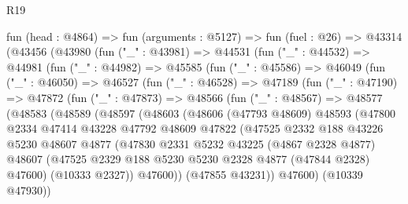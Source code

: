 \begin{lexlean}{R19}
\begin{coremodule}
  fun (head : @4864) =>
  fun (arguments : @5127) =>
  fun (fuel : @26) =>
  @43314
    (@43456
      (@43980
        (fun ("_" : @43981) =>
        @44531
          (fun ("_" : @44532) =>
          @44981
            (fun ("_" : @44982) =>
            @45585
              (fun ("_" : @45586) =>
              @46049
                (fun ("_" : @46050) =>
                @46527
                  (fun ("_" : @46528) =>
                  @47189
                    (fun ("_" : @47190) =>
                    @47872
                      (fun ("_" : @47873) =>
                      @48566
                        (fun ("_" : @48567) =>
                        @48577
                          (@48583
                            (@48589
                              (@48597
                                (@48603
                                  (@48606
                                    (@47793 @48609)
                                    @48593
                                    (@47800
                                      @2334
                                      @47414
                                      @43228
                                      @47792
                                      @48609
                                      @47822
                                      (@47525
                                        @2332
                                        @188
                                        @43226
                                        @5230
                                        @48607
                                        @4877
                                        (@47830
                                          @2331
                                          @5232
                                          @43225
                                          (@4867 @2328 @4877)
                                          @48607
                                          (@47525
                                            @2329
                                            @188
                                            @5230
                                            @5230
                                            @2328
                                            @4877
                                            (@47844 @2328)
                                            @47600)
                                          (@10333 @2327))
                                        @47600))
                                    (@47855 @43231))
                                  @47600)
                                (@10339 @47930))

\end{coremodule}
\end{lexlean}
